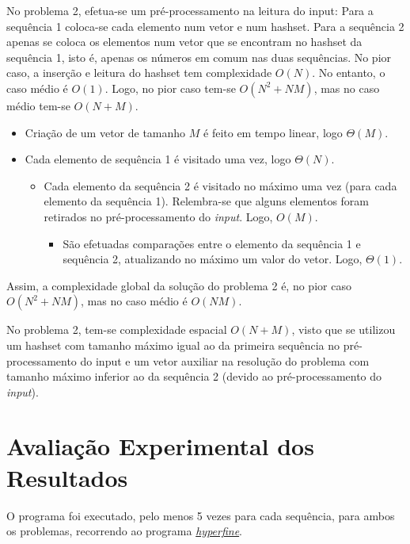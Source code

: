 \documentclass[12pt,a4paper]{article}
\begin{document}
  No problema 2, efetua-se um pré-processamento na leitura do input:
    Para a sequência 1 coloca-se cada elemento num vetor e num hashset.
    Para a sequência 2 apenas se coloca os elementos num vetor que se encontram no hashset da sequência 1, isto é, apenas os números em comum nas duas sequências.
  No pior caso, a inserção e leitura do hashset tem complexidade $O(N)$.
  No entanto, o caso médio é $O(1)$.
  Logo, no pior caso tem-se $O(N^2 + NM)$, mas no caso médio tem-se $O(N + M)$.

  \begin{itemize}
    \setlength{\itemsep}{0pt}
    \item Criação de um vetor de tamanho $M$ é feito em tempo linear, logo $\Theta(M)$.
    \item Cada elemento de sequência 1 é visitado uma vez, logo $\Theta(N)$.
    \begin{itemize}
      \setlength{\itemsep}{0pt}
      \item Cada elemento da sequência 2 é visitado no máximo uma vez (para cada elemento da sequência 1). Relembra-se que alguns elementos foram retirados no pré-processamento do \textit{input}. Logo, $O(M)$.
      \begin{itemize}
        \setlength{\itemsep}{0pt}
        \item São efetuadas comparações entre o elemento da sequência 1 e sequência 2, atualizando no máximo um valor do vetor. Logo, $\Theta(1)$.
      \end{itemize}
    \end{itemize}
  \end{itemize}

  Assim, a complexidade global da solução do problema 2 é, no pior caso $O(N^2 + NM)$, mas no caso médio é $O(NM)$.

  No problema 2, tem-se complexidade espacial $O(N + M)$, visto que se utilizou um hashset com tamanho máximo igual ao da primeira sequência no pré-processamento do input e um vetor auxiliar na resolução do problema com tamanho máximo inferior ao da sequência 2 (devido ao pré-processamento do \textit{input}).

  \section{Avaliação Experimental dos Resultados}

  O programa foi executado, pelo menos 5 vezes para cada sequência, para ambos os problemas, recorrendo ao programa \href{https://github.com/sharkdp/hyperfine}{\textit{hyperfine}}.
\end{document}
